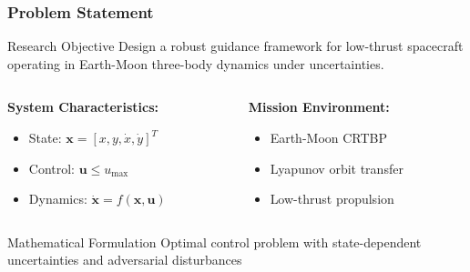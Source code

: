 \documentclass[
    11pt, %
    aspectratio=169, %
]{beamer}
\begin{document}
\begin{frame}
	\frametitle{Problem Statement}
    \vspace{-0.35cm}
	\begin{block}{Research Objective}
		Design a robust guidance framework for low-thrust spacecraft operating in Earth-Moon three-body dynamics under uncertainties.
	\end{block}
	
	\begin{columns}[t]
		\begin{column}{0.5\textwidth}
			\textbf{System Characteristics:}
			\begin{itemize}
				\item State: $\mathbf{x} = [x, y, \dot{x}, \dot{y}]^T$
				\item Control: $\mathbf{u} \leq u_{\max}$
				\item Dynamics: $\dot{\mathbf{x}} = f(\mathbf{x}, \mathbf{u})$
			\end{itemize}
		\end{column}
		\begin{column}{0.5\textwidth}
			\textbf{Mission Environment:}
			\begin{itemize}
				\item Earth-Moon CRTBP
				\item Lyapunov orbit transfer
				\item Low-thrust propulsion
			\end{itemize}
		\end{column}
	\end{columns}
	
    \begin{minipage}
        {0.93\textwidth}
            \begin{exampleblock}{Mathematical Formulation}
		Optimal control problem with state-dependent uncertainties and adversarial disturbances
	\end{exampleblock}
    \end{minipage}
\end{frame}
\end{document}
